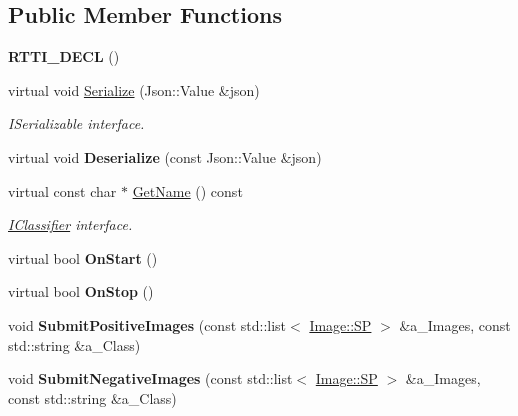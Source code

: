 \subsection*{Public Member Functions}
\begin{DoxyCompactItemize}
\item 
\mbox{\label{class_image_classifier_a323510c8782c91b5d7977f5960d81eac}} 
{\bfseries R\+T\+T\+I\+\_\+\+D\+E\+CL} ()
\item 
\mbox{\label{class_image_classifier_a95b05e2966287844a70ac57e640ca393}} 
virtual void \hyperlink{class_image_classifier_a95b05e2966287844a70ac57e640ca393}{Serialize} (Json\+::\+Value \&json)
\begin{DoxyCompactList}\small\item\em I\+Serializable interface. \end{DoxyCompactList}\item 
\mbox{\label{class_image_classifier_a2111cf8713b66a041f26f26f8c38498d}} 
virtual void {\bfseries Deserialize} (const Json\+::\+Value \&json)
\item 
\mbox{\label{class_image_classifier_a55d7a9fcd4a011a5c51def55bf4c5645}} 
virtual const char $\ast$ \hyperlink{class_image_classifier_a55d7a9fcd4a011a5c51def55bf4c5645}{Get\+Name} () const
\begin{DoxyCompactList}\small\item\em \hyperlink{class_i_classifier}{I\+Classifier} interface. \end{DoxyCompactList}\item 
\mbox{\label{class_image_classifier_a363dc6d5b26fa9b0d854b4dcf97a9dd2}} 
virtual bool {\bfseries On\+Start} ()
\item 
\mbox{\label{class_image_classifier_a69a995fcfec4f71c2755ded978af7b1d}} 
virtual bool {\bfseries On\+Stop} ()
\item 
\mbox{\label{class_image_classifier_acbc97064d1ff0e18586b1908a3b3f4ff}} 
void {\bfseries Submit\+Positive\+Images} (const std\+::list$<$ \hyperlink{class_image_a441de502d70eb0b0a61de6fe6ad6a5fd}{Image\+::\+SP} $>$ \&a\+\_\+\+Images, const std\+::string \&a\+\_\+\+Class)
\item 
\mbox{\label{class_image_classifier_ac202215367338e8a2fb06f9fe304cb7d}} 
void {\bfseries Submit\+Negative\+Images} (const std\+::list$<$ \hyperlink{class_image_a441de502d70eb0b0a61de6fe6ad6a5fd}{Image\+::\+SP} $>$ \&a\+\_\+\+Images, const std\+::string \&a\+\_\+\+Class)
\end{DoxyCompactItemize}
